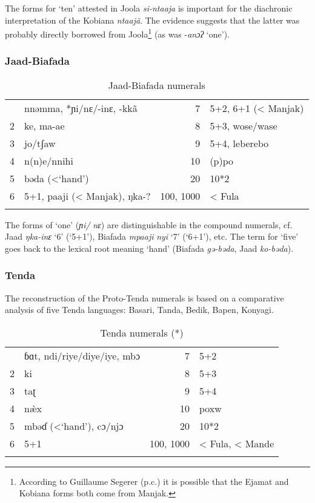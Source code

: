 {The forms for ‘ten’ attested in Joola} {\textit{si-ntaaja}}{ is important for the diachronic interpretation of the Kobiana} {\textit{ntaaj{\~{a}}}}{. The evidence suggests that the latter was probably directly borrowed from Joola}\footnote{According to Guillaume Segerer (p.c.) it is possible that the Ejamat and Kobiana forms both come from Manjak.} { (as was} -\textit{anɔʔ} ‘one’{).}

\subsubsection{Jaad-Biafada}%
\begin{table}
\caption{\label{tab:3:224}Jaad-Biafada numerals}
\begin{tabularx}{\textwidth}{lQrl}
 & nnəmma, *ɲi/nɛ/-inɛ, -kk{\~{a}} & 7 & 5+2, 6+1 (< Manjak)\\
2 & ke, ma-ae & 8 & 5+3, wose/wase\\
3 & jo/tʃaw & 9 & 5+4, leberebo\\
4 & n(n)e/nnihi & 10 & (p)po\\
5 & bəda (<‘hand') & 20 & 10*2\\
6 & 5+1, paaji (< Manjak), ŋka-? & 100, 1000 & < Fula\\
\lspbottomrule
\end{tabularx}
\end{table}

The forms of ‘one’ (\textit{ɲi/} \textit{nɛ}) are distinguishable in the compound numerals, cf. Jaad \textit{ŋka-inɛ} ‘6’ (‘5+1’), Biafada \textit{mpaaji} \textit{nyi} ‘7’ (‘6+1’), etc. The term for ‘five’ goes back to the lexical root meaning ‘hand’ (Biafada \textit{gə-bəda}, Jaad \textit{ko-bəda}).

\subsubsection{Tenda}%
The reconstruction of the Proto-Tenda numerals \citep{Pozdniakovms} is based on a comparative analysis of five Tenda languages: Basari, Tanda, Bedik, Bapen, Konyagi.

\begin{table}
\caption{\label{tab:3:225}Tenda numerals (*)}
\begin{tabularx}{\textwidth}{lQrl}
 & {ɓɑt, ndi/riye/diye/iye, mbɔ} & 7 & 5+2\\
2 & ki & 8 & 5+3\\
3 & taʈ & 9 & 5+4\\
4 & {n{\`{æ}}x} & 10 & poxw\\
5 & mbəɗ (<`hand'), cɔ/njɔ & 20 & 10*2\\
6 & 5+1 & 100, 1000 & < Fula, < Mande\\
\lspbottomrule
\end{tabularx}
\end{table}

